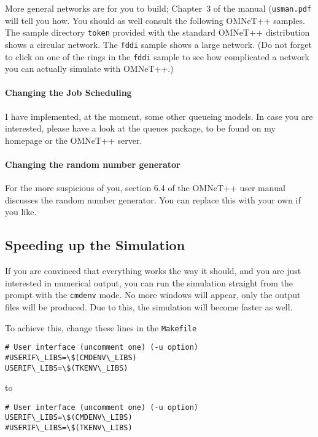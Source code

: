 \documentclass[a4paper]{article}
\begin{document}
More general networks are for you to build; Chapter~3 of the manual (\texttt{usman.pdf}
will tell you how. You should as well consult the following OMNeT++
samples. The sample directory \texttt{token} provided with the
standard OMNeT++ distribution shows a circular network. The
\texttt{fddi} sample shows a large network. (Do not forget to click on
one of the rings in the \texttt{fddi} sample to see how complicated a
network you can actually simulate with OMNeT++.)


\paragraph{Changing the Job Scheduling}
\label{sec:chang-job-sched}
I have implemented, at the moment, some other queueing models. In case you are
interested, please have a look at the queues package, to be found on
my homepage or the OMNeT++ server. 

\paragraph{Changing the random number generator}
\label{sec:chang-rand-numb}
For the more suspicious of you, section 6.4 of the OMNeT++
user manual discusses the random number generator. You can replace
this with your own if you like.


\subsection{Speeding up the Simulation}
\label{sec:speed-up-simul}
If you are convinced that everything works the way it should, and you
are just interested in numerical output, you can run the simulation
straight from the prompt with the \texttt{cmdenv} mode. No more
windows will appear, only the output files will be produced. Due to
this, the simulation will become faster as well.

To achieve this, change these lines in the  \texttt{Makefile}

\begin{verbatim}
# User interface (uncomment one) (-u option)
#USERIF\_LIBS=\$(CMDENV\_LIBS)
USERIF\_LIBS=\$(TKENV\_LIBS)
\end{verbatim}

to

\begin{verbatim}
# User interface (uncomment one) (-u option)
USERIF\_LIBS=\$(CMDENV\_LIBS)
#USERIF\_LIBS=\$(TKENV\_LIBS)
\end{verbatim}
\end{document}
